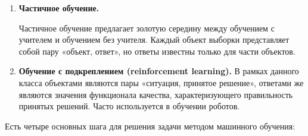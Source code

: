 \begin{enumerate}
	\item \textbf{Частичное обучение.}
	
	Частичное обучение предлагает золотую середину между обучением с учителем и обучением без учителя. Каждый объект выборки представляет собой пару «объект, ответ», но ответы известны только для части объектов. 
	
	\item \textbf{Обучение с подкреплением (reinforcement learning).}
	В рамках данного класса объектами являются пары «ситуация, принятое решение», ответами же являются значения функционала качества, характеризующего правильность принятых решений. Часто используется в обучении роботов.
\end{enumerate}


Есть четыре основных шага для решения задачи методом машинного обучения:
